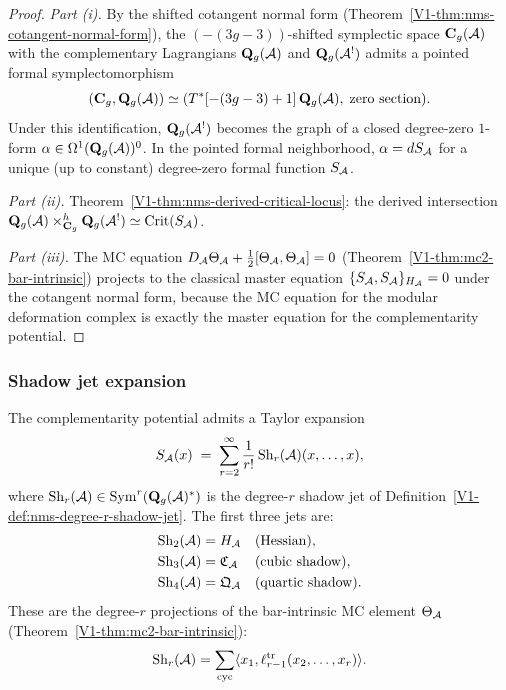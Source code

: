 \begin{proof}
\emph{Part (i).}
By the shifted cotangent normal form
(Theorem~\ref{V1-thm:nms-cotangent-normal-form}), the
$(-(3g-3))$-shifted symplectic space $\mathbf{C}_g(\mathcal{A})$ with
the complementary Lagrangians $\mathbf{Q}_g(\mathcal{A})$ and
$\mathbf{Q}_g(\mathcal{A}^!)$ admits a pointed formal
symplectomorphism
\[
(\mathbf{C}_g, \mathbf{Q}_g(\mathcal{A}))
\simeq
(T^*[-(3g-3)+1]\,\mathbf{Q}_g(\mathcal{A}),\; \text{zero section}).
\]
Under this identification, $\mathbf{Q}_g(\mathcal{A}^!)$ becomes the
graph of a closed degree-zero $1$-form
$\alpha \in \Omega^1(\mathbf{Q}_g(\mathcal{A}))^0$. In the pointed
formal neighborhood, $\alpha = dS_{\mathcal{A}}$ for a unique (up to
constant) degree-zero formal function $S_{\mathcal{A}}$.

\emph{Part (ii).}
Theorem~\ref{V1-thm:nms-derived-critical-locus}: the derived
intersection $\mathbf{Q}_g(\mathcal{A}) \times^h_{\mathbf{C}_g}
\mathbf{Q}_g(\mathcal{A}^!) \simeq \operatorname{Crit}(S_{\mathcal{A}})$.

\emph{Part (iii).}
The MC equation
$D_{\mathcal{A}} \Theta_{\mathcal{A}} + \tfrac{1}{2}[\Theta_{\mathcal{A}}, \Theta_{\mathcal{A}}] = 0$
(Theorem~\ref*{V1-thm:mc2-bar-intrinsic}) projects to the
classical master equation $\{S_{\mathcal{A}}, S_{\mathcal{A}}\}_{H_{\mathcal{A}}} = 0$
under the cotangent normal form, because the MC equation for
the modular deformation complex is exactly the master equation
for the complementarity potential.
\end{proof}

\subsubsection{Shadow jet expansion}

\begin{theorem}
The complementarity potential admits a Taylor expansion
\begin{equation}%
S_\cA(x)
\;=\;
\sum_{r=2}^{\infty}
\frac{1}{r!}\,\Sh_r(\cA)(x, \ldots, x),
\end{equation}
where $\mathrm{Sh}_r(\mathcal{A}) \in \operatorname{Sym}^r(\mathbf{Q}_g(\mathcal{A})^*)$ is the
degree-$r$ shadow jet of
Definition~\textup{\ref{V1-def:nms-degree-r-shadow-jet}}.
The first three jets are:
\begin{align}
\mathrm{Sh}_2(\mathcal{A}) &= H_{\mathcal{A}}
 && \text{\textup{(}Hessian\textup{)}},
\\
\mathrm{Sh}_3(\mathcal{A}) &= \mathfrak{C}_{\mathcal{A}}
 && \text{\textup{(}cubic shadow\textup{)}},
\\
\mathrm{Sh}_4(\mathcal{A}) &= \mathfrak{Q}_{\mathcal{A}}
 && \text{\textup{(}quartic shadow\textup{)}}.
\end{align}
These are the degree-$r$ projections of the bar-intrinsic MC
element $\Theta_{\mathcal{A}}$
\textup{(}Theorem~\textup{\ref*{V1-thm:mc2-bar-intrinsic})}:
\begin{equation}%
\Sh_r(\cA)
= \sum_{\mathrm{cyc}}
\langle x_1, \ell_{r-1}^{\mathrm{tr}}(x_2, \ldots, x_r) \rangle.
\end{equation}
\end{theorem}

